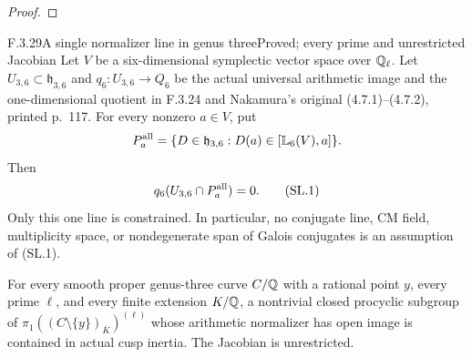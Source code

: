 \begin{proof}
\end{proof}

\begin{result}{F.3.29}{A single normalizer line in genus three}{Proved; every prime and unrestricted Jacobian}
Let $V$ be a six-dimensional symplectic vector space over $\mathbb Q_\ell$.
Let $U_{3,6}\subset\mathfrak h_{3,6}$ and
$q_6:U_{3,6}\to Q_6$ be the actual universal arithmetic image and
the one-dimensional quotient in F.3.24 and Nakamura's original
(4.7.1)--(4.7.2), printed p.~117.
For every nonzero $a\in V$, put
\[
 P_a^{\rm all}=\{D\in\mathfrak h_{3,6}:
                         D(a)\in[\mathbb L_6(V),a]\}.
\]
Then
\[
                    q_6(U_{3,6}\cap P_a^{\rm all})=0.       \tag{SL.1}
\]
Only this one line is constrained. In particular, no conjugate line,
CM field, multiplicity space, or nondegenerate span of Galois conjugates
is an assumption of (SL.1).

For every smooth proper genus-three curve $C/\mathbb Q$ with a rational
point $y$, every prime $\ell$, and every finite extension $K/\mathbb Q$,
a nontrivial closed procyclic subgroup of
$\pi_1((C\setminus\{y\})_{\overline K})^{(\ell)}$
whose arithmetic normalizer has open image is contained in actual
cusp inertia. The Jacobian is unrestricted.
\end{result}
